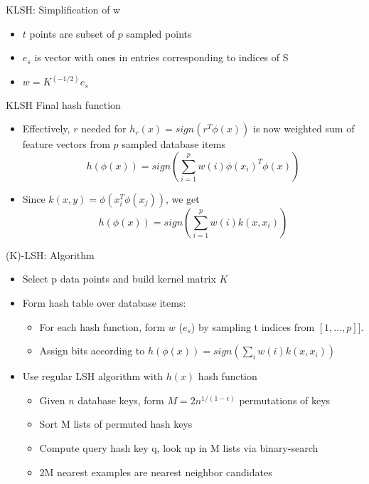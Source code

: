 \documentclass[12pt,a4paper]{beamer}
\begin{document}
\begin{frame}{KLSH: Simplification of w }
\begin{itemize}
\item $t$ points are subset of $p$ sampled points
\item $e_s$ is vector with ones in entries corresponding to indices of S
\item $w = K^{(-1/2)} e_s$
\end{itemize}
\end{frame}



\begin{frame}{KLSH Final hash function}
\begin{itemize}
\item Effectively, $r$ needed for $h_r(x)=sign(r^T\phi(x))$ is now weighted sum of feature vectors from $p$ sampled database items
$$h(\phi(x)) = sign(\sum_{i=1}^{p}w(i)\phi(x_{i})^{T}\phi(x))$$
\item Since $k(x,y) = \phi(x_{i}^{T}\phi(x_{j}))$, we get
$$h(\phi(x)) = sign(\sum_{i=1}^{p}w(i)k(x,x_{i}))$$
\end{itemize}
\end{frame}

\begin{frame}{(K)-LSH: Algorithm}
\begin{itemize}
\item Select p data points and build kernel matrix $K$
\item Form hash table over database items:
\begin{itemize}
\item For each hash function, form $w$ ($e_s$) by sampling t indices from $[1,...,p]]$.
\item Assign bits according to $h(\phi (x)) = sign (\sum_{i} w(i) k(x, x_{i}) )$
\end{itemize}
\item Use regular LSH algorithm with $h(x)$ hash function

    \begin{itemize}
    \item Given $n$ database keys, form $M=2n^{1/(1-\epsilon)}$ permutations of keys
    \item Sort M lists of permuted hash keys
    \item Compute query hash key q, look up in M lists via binary-search
    \item 2M nearest examples are nearest neighbor candidates
    \end{itemize}

\end{itemize}
\end{frame}
\end{document}

